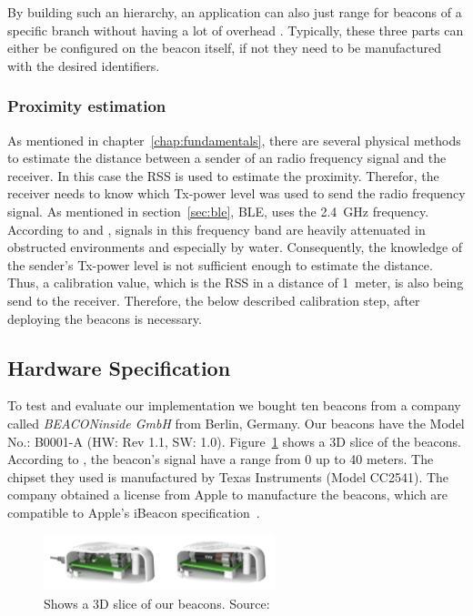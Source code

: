 By building such an hierarchy, an application can also just range for beacons of a specific branch without having a lot of overhead \citep{apple:getting_started,binside:ds}. Typically, these three parts can either be configured on the beacon itself, if not they need to be manufactured with the desired identifiers.

\subsubsection*{Proximity estimation}
As mentioned in chapter~\ref{chap:fundamentals}, there are several physical methods to estimate the distance between a sender of an radio frequency signal and the receiver. In this case the \acl{RSS} is used to estimate the proximity. Therefor, the receiver needs to know which Tx-power level was used to send the radio frequency signal. As mentioned in section~\ref{sec:ble}, \ac{BLE}, uses the 2.4~GHz frequency. According to \citet{apple:getting_started} and \citet{binside:ds}, signals in this frequency band are heavily attenuated in obstructed environments and especially by water. Consequently, the knowledge of the sender's Tx-power level is not sufficient enough to estimate the distance. Thus, a calibration value, which is the \acl{RSS} in a distance of 1~meter, is also being send to the receiver. Therefore, the below described calibration step, after deploying the beacons is necessary.

\subsection{Hardware Specification} To test and evaluate our implementation we bought ten beacons from a company called \emph{BEACONinside GmbH} from Berlin, Germany. Our beacons have the Model No.: B0001-A (HW: Rev 1.1, SW: 1.0). Figure~\ref{fig:bi:beacons} shows a 3D slice of the beacons. According to \citet{binside:ds}, the beacon's signal have a range from 0 up to 40 meters. The chipset they used is manufactured by Texas Instruments (Model CC2541). The company obtained a license from Apple to manufacture the beacons, which are compatible to Apple's iBeacon specification~\citep{binside:ds}.

\begin{figure}
	\includegraphics[width=0.6\textwidth]{figures/BEACONinside_beacons}
	\caption{Shows a 3D slice of our beacons. Source:~\citep{binside:ds}}
	\label{fig:bi:beacons}
\end{figure}

